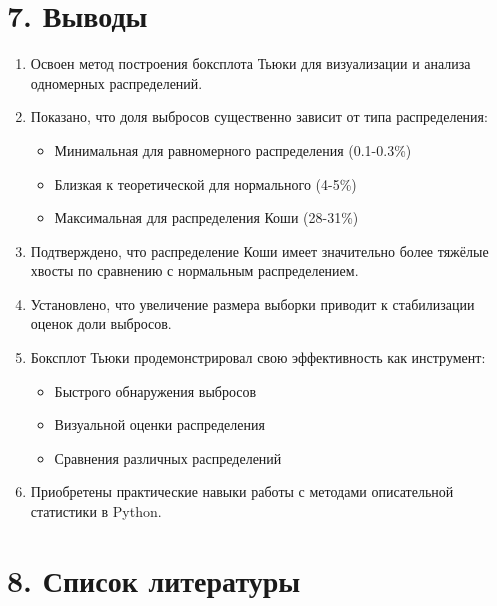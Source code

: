 \documentclass[a4paper,14pt]{extarticle}
\begin{document}
\section*{7. Выводы}

\begin{enumerate}
    \item Освоен метод построения боксплота Тьюки для визуализации и анализа одномерных распределений.
    
    \item Показано, что доля выбросов существенно зависит от типа распределения:
    \begin{itemize}
        \item Минимальная для равномерного распределения (0.1-0.3\%)
        \item Близкая к теоретической для нормального (4-5\%)
        \item Максимальная для распределения Коши (28-31\%)
    \end{itemize}
    
    \item Подтверждено, что распределение Коши имеет значительно более тяжёлые хвосты по сравнению с нормальным распределением.
    
    \item Установлено, что увеличение размера выборки приводит к стабилизации оценок доли выбросов.
    
    \item Боксплот Тьюки продемонстрировал свою эффективность как инструмент:
    \begin{itemize}
        \item Быстрого обнаружения выбросов
        \item Визуальной оценки распределения
        \item Сравнения различных распределений
    \end{itemize}
    
    \item Приобретены практические навыки работы с методами описательной статистики в Python.
\end{enumerate}

\section*{8. Список литературы}
\end{document}
